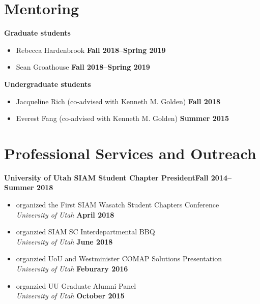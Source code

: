 \documentclass[margin,line]{res}
\begin{document}
\begin{resume}
\section{\sc Mentoring}
{\bf Graduate students}
\begin{itemize}
\item[ ] Rebecca Hardenbrook
\hfill {\bf Fall 2018--Spring 2019}
\item [] Sean Groathouse
\hfill {\bf Fall 2018--Spring 2019}
\end{itemize}
{\bf Undergraduate students}
\begin{itemize}
\item[ ] Jacqueline Rich (co-advised with Kenneth M. Golden) 
\hfill {\bf Fall 2018}
\item[ ] Everest Fang (co-advised with Kenneth M. Golden)
\hfill {\bf Summer 2015}
\end{itemize}

\section{\sc Professional Services and Outreach}

{\bf University of Utah SIAM Student Chapter President}\hfill{\bf Fall 2014--Summer 2018}
\begin{itemize}
\item[ ] organized the First SIAM Wasatch Student Chapters Conference 
\\ {\it University of Utah} \hfill {\bf April 2018}
\item[ ] organzied SIAM SC Interdepartmental BBQ 
\\ {\it University of Utah} \hfill {\bf June 2018}
\item[ ] organzied UoU and Westminister COMAP Solutions Presentation
\\ {\it University of Utah} \hfill {\bf Feburary 2016}
\item[ ] organzied UU Graduate Alumni Panel 
\\ {\it University of Utah} \hfill {\bf October 2015}
\end{itemize}


\end{resume}
\end{document}

